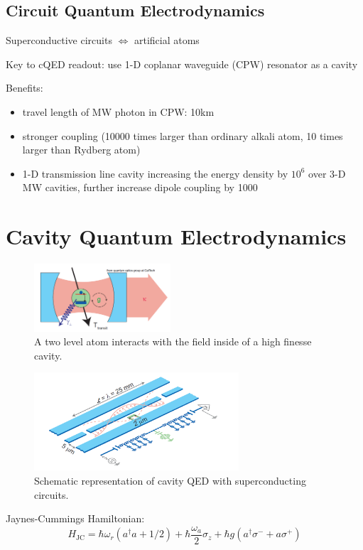 \documentclass[8pt,a4paper,twocolumn]{article} %
\numberwithin{equation}{section} %
\begin{document}
		\subsection{Circuit Quantum Electrodynamics} %
		\label{sub:circuit_quantum_electrodynamics}
			Superconductive circuits $\Longleftrightarrow $ artificial atoms

			Key to cQED readout: use 1-D coplanar waveguide (CPW) resonator as a cavity

			Benefits:
			\begin{itemize}
				\item travel length of MW photon in CPW: 10km
				\item stronger coupling (10000 times larger than ordinary alkali atom, 10 times larger than Rydberg atom)
				\item 1-D transmission line cavity increasing the energy density by $10^6$ over 3-D MW cavities, further increase dipole coupling by 1000
			\end{itemize}



	\section{Cavity Quantum Electrodynamics} %
	\label{sec:cavity_quantum_electrodynamics}
		\begin{figure}[!h]
			\centering
			\includegraphics[width=2in]{cavityQED.png}
			\caption{A two level atom interacts with the field inside of a high finesse cavity. \cite{Schuster2007}}
			\label{pic:cavityQED}
		\end{figure}
		\begin{figure}[!h]
			\centering
			\includegraphics[width=3in]{cQEDwithSuCondQubit.png}
			\caption{Schematic representation of cavity QED with superconducting circuits. \cite{Schuster2007}}
			\label{pic:cQEDwithSuCondQubit}
		\end{figure}
		Jaynes-Cummings Hamiltonian:
		\begin{equation}
			H_{\text{JC}} = \hbar \omega_r (a^{\dagger}a+1/2)+ \hbar \frac{\omega_a}{2} \sigma_z + \hbar g ( a^{\dagger} \sigma^- + a \sigma^+ )
		\end{equation}
\end{document}
